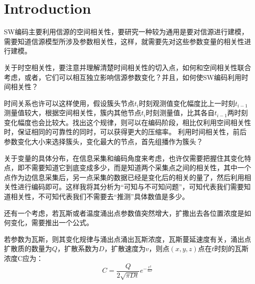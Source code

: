 \chapter{Introduction}


SW编码主要利用信源的空间相关性，要研究一种较为通用是要对信源进行建模，需要知道信源模型所涉及参数相关性，这样，就需要先对这些参数变量的相关性进行建模。

关于时空相关性，要注意并理解清楚时间相关性的切入点，如何和空间相关性联合考虑，或者，它们可以相互独立影响信源参数变化？并且，如何使SW编码利用时间相关性？ 


时间关系也许可以这样使用，假设簇头节点$t_i$时刻观测值变化幅度比上一时刻$t_{i-1}$测量值较大，根据空间相关性，簇内其他节点$t_i$时刻测量值，比其各自$t_{i-1}$两时刻变化幅度也会比较大。找出这个规律，则可以在编码阶段，相比仅利用空间相关性时，保证相同的可靠性的同时，可以获得更大的压缩率。
利用时间相关性，前后参数变化大小来选择簇头，变化最大的节点，首先组播作为簇头？

关于变量的具体分布，在信息采集和编码角度来考虑，也许仅需要把握住其变化特点，即不需要知道它到底变成多少，而是知道两个采集点之间的相关性，其中一个点作为边信息采集后，另一点采集的数据已经是变化后的相关的量了，然后利用相关性进行编码即可。这样我将其分析为``可知与不可知问题''，可知代表我们需要知道相关性，不可知代表我们不需要去``推测''具体数值是多少。

还有一个考虑，若瓦斯或者温度涌出点参数值突然增大，扩撒出去各位置浓度是如何变化，需要推出一个公式。

若参数为瓦斯，则其变化规律与涌出点涌出瓦斯浓度，瓦斯蔓延速度有关，涌出点扩散质的数量为$Q$，扩散系数为$D$，扩散速度为$v$，则点$(x,y,z)$点在$t$时刻的瓦斯浓度C应为：
\begin{equation*}
    C=\dfrac{Q}{2\sqrt{\pi D t}}e^{-\frac{x^2}{4D}}
\end{equation*}


